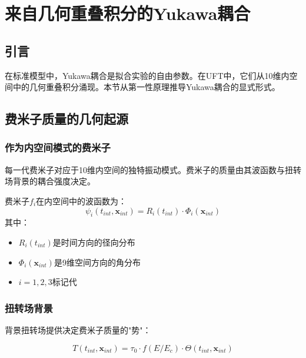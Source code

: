 \section{来自几何重叠积分的Yukawa耦合}
\label{sec:yukawa_geometric}

\subsection{引言}

在标准模型中，Yukawa耦合是拟合实验的自由参数。在UFT中，它们从10维内空间中的几何重叠积分涌现。本节从第一性原理推导Yukawa耦合的显式形式。

\subsection{费米子质量的几何起源}

\subsubsection{作为内空间模式的费米子}

\begin{insight}[费米子是内几何的激发]
每一代费米子对应于10维内空间的独特振动模式。费米子的质量由其波函数与扭转场背景的耦合强度决定。
\end{insight}

\begin{definition}[内空间中的费米子波函数]
费米子$f_i$在内空间中的波函数为：
\begin{equation}
    \psi_i(t_{int}, \mathbf{x}_{int}) = R_i(t_{int}) \cdot \Phi_i(\mathbf{x}_{int})
\end{equation}
其中：
\begin{itemize}
    \item $R_i(t_{int})$是时间方向的径向分布
    \item $\Phi_i(\mathbf{x}_{int})$是9维空间方向的角分布
    \item $i = 1, 2, 3$标记代
\end{itemize}
\end{definition}

\subsubsection{扭转场背景}

背景扭转场提供决定费米子质量的"势"：

\begin{equation}
    T(t_{int}, \mathbf{x}_{int}) = \tau_0 \cdot f(E/E_c) \cdot \Theta(t_{int}, \mathbf{x}_{int})
\end{equation}


